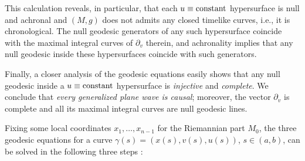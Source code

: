 This calculation reveals, in particular, that each $u\equiv\hbox{constant}$ hypersurface is null and achronal and $(M,g)$ does not admits any closed timelike curves, i.e., it is chronological. The null geodesic generators of any such hypersurface coincide with the maximal integral curves of $\partial_{v}$ therein, and achronality implies that any null geodesic inside these hypersurfaces coincide with such generators.

Finally, a closer analysis of the geodesic equations easily shows that any null geodesic inside a $u\equiv\hbox{constant}$ hypersurface is {\em injective} and {\em complete}. We conclude that {\em every generalized plane wave is causal}; moreover, the vector $\partial_v$ is complete and all its maximal integral curves are null geodesic lines.


Fixing some local coordinates $x_1, \dots, x_{n-1}$ for the Riemannian
part $M_0$,
%
%
%
%
the three geodesic equations for
a curve $\gamma(s)= (x(s), v(s), u(s))$, $s\in (a,b)$, can be solved in
the following three steps  \cite[Proposition 3.1]{CandelaGeneralPlaneFronted2003}:
